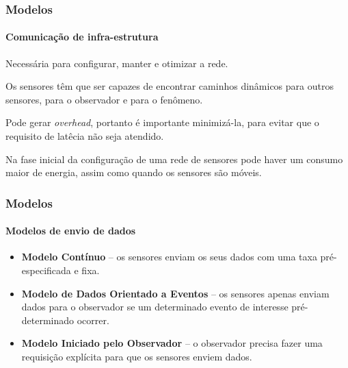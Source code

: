 \documentclass[notes]{beamer}
\begin{document}
\begin{frame}
\frametitle{Modelos}
\framesubtitle{Comunicação de infra-estrutura}

\begin{block}

Necessária para configurar, manter e otimizar a rede.

\end{block} \pause

\begin{block}

Os sensores têm que ser capazes de encontrar caminhos dinâmicos para outros sensores, para o observador e para o fenômeno.

\end{block} \pause

\begin{block}

Pode gerar \textit{overhead}, portanto é importante minimizá-la, para evitar que o requisito de latêcia não seja atendido. 

\end{block} \pause

\begin{block}

Na fase inicial da configuração de uma rede de sensores pode haver um consumo maior de energia, assim como quando os sensores são móveis. 

\end{block}

\end{frame}

\begin{frame}


\frametitle{Modelos}
\framesubtitle{Modelos de envio de dados}

\begin{block}

\begin{itemize}

\item \textbf{Modelo Contínuo} – os sensores enviam os seus dados com uma taxa pré-especificada e fixa. \pause
\item \textbf{Modelo de Dados Orientado a Eventos} – os sensores apenas enviam dados para o observador se um determinado evento de interesse pré-determinado ocorrer. \pause
\item \textbf{Modelo Iniciado pelo Observador} – o observador precisa fazer uma requisição explícita para que os sensores enviem dados. 

\end{itemize}
\end{block}

\end{frame}
\end{document}
